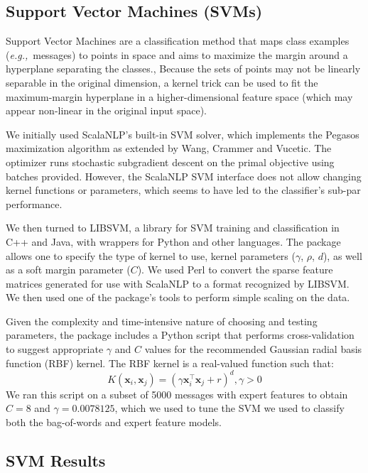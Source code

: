 \documentclass[preprint]{acm_proc_article-sp}
\newcommand{\eg}{{\em e.g.,}~}
\begin{document}
\subsection{Support Vector Machines (SVMs)}


Support Vector Machines are a classification method that maps class examples (\eg messages) to points 
in space and aims to maximize the margin around a hyperplane separating the classes.\cite{boser}, \cite{cortesv95} 
Because the sets of points may not be linearly separable in the original dimension, a kernel trick can 
be used to fit the maximum-margin hyperplane in a higher-dimensional feature space (which may appear 
non-linear in the original input space).

We initially used ScalaNLP's built-in SVM solver, which implements the Pegasos maximization algorithm\cite{pegasos} 
as extended by Wang, Crammer and Vucetic\cite{wang2}. 
The optimizer runs stochastic subgradient descent on the primal objective 
using batches provided. However, the ScalaNLP SVM interface does not allow changing kernel functions or parameters, 
which seems to have led to the classifier's sub-par performance.

We then turned to LIBSVM, a library for SVM training and classification in C++ and Java, with wrappers for 
Python and other languages. The package allows one to specify the type of kernel to use, kernel parameters 
($\gamma$, $\rho$, $d$), as well as a soft margin parameter ($C$). We used Perl to convert the sparse feature 
matrices generated for use with ScalaNLP to a format recognized by LIBSVM. We then used one of the package's 
tools to perform simple scaling on the data. 

Given the complexity and time-intensive nature of choosing and testing parameters, the 
package includes a Python script that performs cross-validation to suggest appropriate 
$\gamma$ and $C$ values for the recommended Gaussian radial basis function (RBF) kernel. The RBF kernel is 
a real-valued function such that: 
$$K(\mathbf{x}_i, \mathbf{x}_j) = (\gamma\mathbf{x}_i^\intercal\mathbf{x}_j+r)^d, \gamma>0$$
We ran this script on a subset of 5000 messages with expert features to obtain $C = 8$ and $\gamma = 0.0078125$, 
which we used to tune the SVM we used to classify both the bag-of-words and expert feature models.

\subsection{SVM Results}
\end{document}
